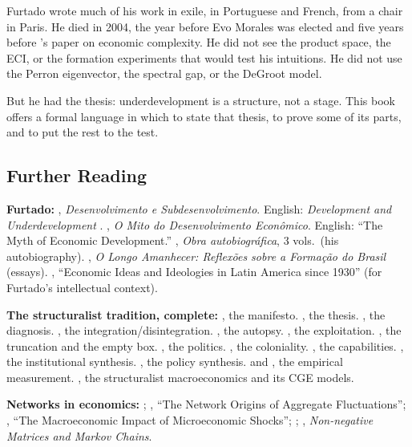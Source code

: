 \documentclass[../structural_economics_book.tex]{subfiles}
\begin{document}
Furtado wrote much of his work in exile, in Portuguese and French, from a chair in Paris. He died in 2004, the year before Evo Morales was elected and five years before \citeauthor{hidalgo2009building}'s \citeyear{hidalgo2009building} paper on economic complexity. He did not see the product space, the ECI, or the formation experiments that would test his intuitions. He did not use the Perron eigenvector, the spectral gap, or the DeGroot model.

But he had the thesis: underdevelopment is a structure, not a stage. This book offers a formal language in which to state that thesis, to prove some of its parts, and to put the rest to the test.


\subsection*{Further Reading}

\textbf{Furtado:} \citet{furtado1961desenvolvimento}, \textit{Desenvolvimento e Subdesenvolvimento}. English: \textit{Development and Underdevelopment} \citep{furtado1964development}. \citet{furtado1974mito}, \textit{O Mito do Desenvolvimento Econ\^{o}mico}. English: ``The Myth of Economic Development.'' \citet{furtado1997obra}, \textit{Obra autobiogr\'{a}fica}, 3 vols.\ (his autobiography). \citet{furtado1999longo}, \textit{O Longo Amanhecer: Reflex\~{o}es sobre a Forma\c{c}\~{a}o do Brasil} (essays). \citet{love1994economic}, ``Economic Ideas and Ideologies in Latin America since 1930'' (for Furtado's intellectual context).

\textbf{The structuralist tradition, complete:} \citet{prebisch1949desarrollo}, the manifesto. \citet{furtado1961desenvolvimento}, the thesis. \citet{pinto1970naturaleza}, the diagnosis. \citet{sunkel1971capitalismo}, the integration/disintegration. \citet{tavares1972substituicao}, the autopsy. \citet{marini1973dialectica}, the exploitation. \citet{fajnzylber1983industrializacion,fajnzylber1990industrializacion}, the truncation and the empty box. \citet{cardoso1969dependencia}, the politics. \citet{quijano2000colonialidad}, the coloniality. \citet{sen1999development}, the capabilities. \citet{cepal2012structural}, the institutional synthesis. \citet{ocampo2009growth}, the policy synthesis. \citet{hidalgo2007product} and \citet{hidalgo2009building}, the empirical measurement. \citet{taylor1983structuralist,taylor1990socially}, the structuralist macroeconomics and its CGE models.

\textbf{Networks in economics:} \citet{long1983real}; \citet{acemoglu2012network}, ``The Network Origins of Aggregate Fluctuations''; \citet{baqaee2019macroeconomic}, ``The Macroeconomic Impact of Microeconomic Shocks''; \citet{golub2010naive,golub2012how}; \citet{seneta2006nonnegative}, \textit{Non-negative Matrices and Markov Chains}.
\end{document}
